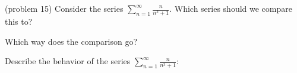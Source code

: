 \documentclass[handout]{ximera}
\begin{document}
\begin{problem}(problem 15)
Consider the series $\displaystyle{\sum_{n=1}^\infty \frac{n}{n^3 + 1}}$.
Which series should we compare this to?

\begin{multipleChoice}
\end{multipleChoice}

Which way does the comparison go?
\begin{multipleChoice}
\end{multipleChoice}

Describe the behavior of the series $\sum_{n=1}^\infty \frac{n}{n^3 + 1}:$
\begin{multipleChoice}
\end{multipleChoice}

\end{problem}
\end{document}
